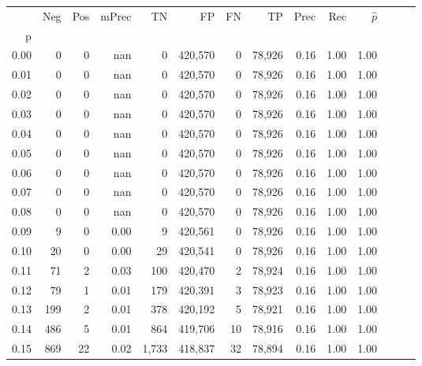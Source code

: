 \begin{tabular}{rrrrrrrrrrrrrr}
\toprule
{} &     Neg &    Pos & mPrec &       TN &       FP &      FN &      TP &  Prec &   Rec & $\hat{p}$ \\
p    &         &        &       &          &          &         &         &       &       &           \\
\midrule
0.00 &       0 &      0 &   nan &        0 &  420,570 &       0 &  78,926 &  0.16 &  1.00 &      1.00 \\
0.01 &       0 &      0 &   nan &        0 &  420,570 &       0 &  78,926 &  0.16 &  1.00 &      1.00 \\
0.02 &       0 &      0 &   nan &        0 &  420,570 &       0 &  78,926 &  0.16 &  1.00 &      1.00 \\
0.03 &       0 &      0 &   nan &        0 &  420,570 &       0 &  78,926 &  0.16 &  1.00 &      1.00 \\
0.04 &       0 &      0 &   nan &        0 &  420,570 &       0 &  78,926 &  0.16 &  1.00 &      1.00 \\
0.05 &       0 &      0 &   nan &        0 &  420,570 &       0 &  78,926 &  0.16 &  1.00 &      1.00 \\
0.06 &       0 &      0 &   nan &        0 &  420,570 &       0 &  78,926 &  0.16 &  1.00 &      1.00 \\
0.07 &       0 &      0 &   nan &        0 &  420,570 &       0 &  78,926 &  0.16 &  1.00 &      1.00 \\
0.08 &       0 &      0 &   nan &        0 &  420,570 &       0 &  78,926 &  0.16 &  1.00 &      1.00 \\
0.09 &       9 &      0 &  0.00 &        9 &  420,561 &       0 &  78,926 &  0.16 &  1.00 &      1.00 \\
0.10 &      20 &      0 &  0.00 &       29 &  420,541 &       0 &  78,926 &  0.16 &  1.00 &      1.00 \\
0.11 &      71 &      2 &  0.03 &      100 &  420,470 &       2 &  78,924 &  0.16 &  1.00 &      1.00 \\
0.12 &      79 &      1 &  0.01 &      179 &  420,391 &       3 &  78,923 &  0.16 &  1.00 &      1.00 \\
0.13 &     199 &      2 &  0.01 &      378 &  420,192 &       5 &  78,921 &  0.16 &  1.00 &      1.00 \\
0.14 &     486 &      5 &  0.01 &      864 &  419,706 &      10 &  78,916 &  0.16 &  1.00 &      1.00 \\
0.15 &     869 &     22 &  0.02 &    1,733 &  418,837 &      32 &  78,894 &  0.16 &  1.00 &      1.00 \\

\end{tabular}
